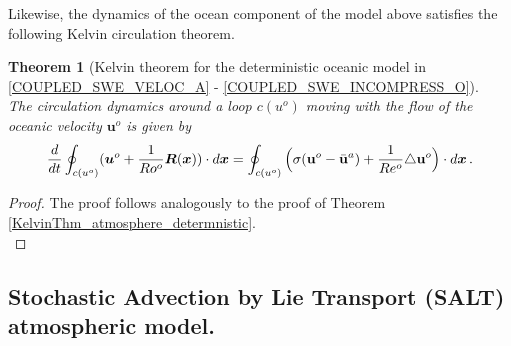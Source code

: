 \documentclass[11pt, oneside]{article}   	%
\numberwithin{equation}{section}
\theoremstyle{plain}
\newtheorem{theorem}{Theorem}[section]
\theoremstyle{definition}
\theoremstyle{remark}
\newcommand{\<}{\langle}
\renewcommand{\>}{\rangle}
\def\U{{\bf u}}
\newcommand{\bs}[1]{\boldsymbol{#1}}
\begin{document}
Likewise, the dynamics of the ocean component of the model above satisfies the following Kelvin circulation theorem. 
\begin{theorem}[Kelvin theorem for the deterministic oceanic model in \eqref{COUPLED_SWE_VELOC_A} - \eqref{COUPLED_SWE_INCOMPRESS_O}]$\,$\\
The circulation dynamics around a loop $c(u^o)$ moving with the flow of the oceanic velocity $\bs{u}^o$ is given by
\begin{align*}
\frac{d}{dt}\oint_{c(u^o)} (\bs{u}^o + \frac{1}{Ro^o}\bs{R}(\bs{x}))\cdot d\bs{x}
= \oint_{c(u^o)} \Big( \sigma(\U^o-\bar{\U}^a)
+ \frac{1}{Re^o} \triangle\U^o 
\Big)\cdot d\bs{x} 
\,.
\end{align*}
\end{theorem}

\begin{proof}
The proof follows analogously to the proof of Theorem \ref{KelvinThm_atmosphere_determnistic}. 
\\%
\end{proof}

\subsection*{Stochastic Advection by Lie Transport (SALT) atmospheric model.} 
\end{document}
